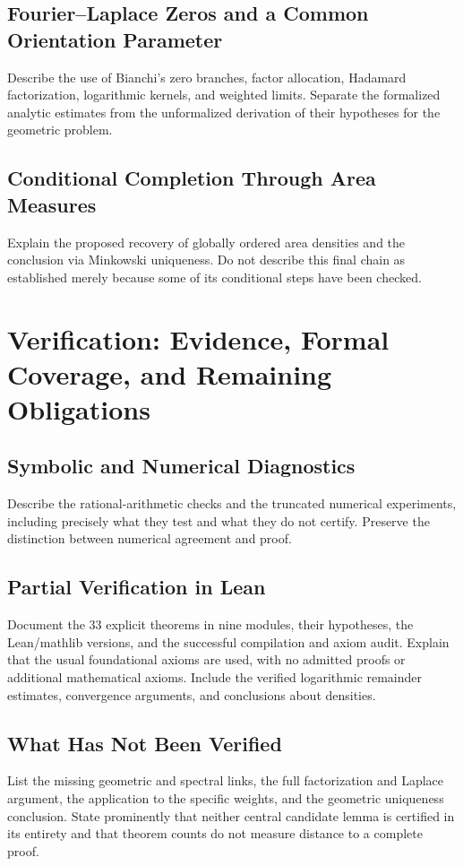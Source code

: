 \documentclass[11pt,a4paper]{article}
\begin{document}
\subsection{Fourier--Laplace Zeros and a Common Orientation Parameter}
Describe the use of Bianchi's zero branches, factor allocation, Hadamard
factorization, logarithmic kernels, and weighted limits. Separate the
formalized analytic estimates from the unformalized derivation of their
hypotheses for the geometric problem.

\subsection{Conditional Completion Through Area Measures}
Explain the proposed recovery of globally ordered area densities and the
conclusion via Minkowski uniqueness. Do not describe this final chain as
established merely because some of its conditional steps have been checked.

\section{Verification: Evidence, Formal Coverage, and Remaining Obligations}
\subsection{Symbolic and Numerical Diagnostics}
Describe the rational-arithmetic checks and the truncated numerical
experiments, including precisely what they test and what they do not certify.
Preserve the distinction between numerical agreement and proof.

\subsection{Partial Verification in Lean}
Document the 33 explicit theorems in nine modules, their hypotheses, the
Lean/mathlib versions, and the successful compilation and axiom audit.
Explain that the usual foundational axioms are used, with no admitted proofs
or additional mathematical axioms. Include the verified logarithmic
remainder estimates, convergence arguments, and conclusions about densities.

\subsection{What Has Not Been Verified}
List the missing geometric and spectral links, the full factorization and
Laplace argument, the application to the specific weights, and the geometric
uniqueness conclusion. State prominently that neither central candidate
lemma is certified in its entirety and that theorem counts do not measure
distance to a complete proof.
\end{document}

